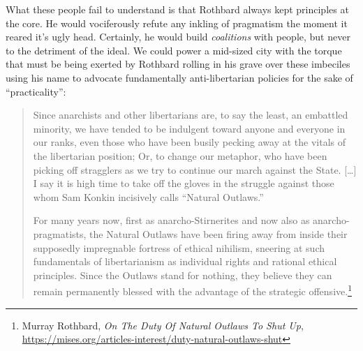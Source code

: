 \documentclass[11pt]{article}
\begin{document}
What these people fail to understand is that Rothbard always kept principles at the core. He would vociferously refute any inkling of pragmatism the moment it reared it's ugly head. Certainly, he would build \emph{coalitions} with people, but never to the detriment of the ideal. We could power a mid-sized city with the torque that must be being exerted by Rothbard rolling in his grave over these imbeciles using his name to advocate fundamentally anti-libertarian policies for the sake of ``practicality'':
\begin{quote}
Since anarchists and other libertarians are, to say the least, an embattled minority, we have tended to be indulgent toward anyone and everyone in our ranks, even those who have been busily pecking away at the vitals of the libertarian position; Or, to change our metaphor, who have been picking off stragglers as we try to continue our march against the State. [\ldots{}] I say it is high time to take off the gloves in the struggle against those whom Sam Konkin incisively calls ``Natural Outlaws.''

For many years now, first as anarcho-Stirnerites and now also as anarcho-pragmatists, the Natural Outlaws have been firing away from inside their supposedly impregnable fortress of ethical nihilism, sneering at such fundamentals of libertarianism as individual rights and rational ethical principles. Since the Outlaws stand for nothing, they believe they can remain permanently blessed with the advantage of the strategic offensive.\footnote{Murray Rothbard, \emph{On The Duty Of Natural Outlaws To Shut Up}, \url{https://mises.org/articles-interest/duty-natural-outlaws-shut}}
\end{quote}
\end{document}
